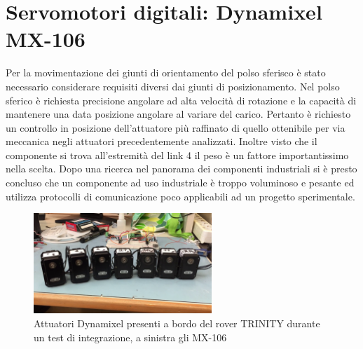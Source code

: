 \documentclass[%
corpo=11pt,
twoside,
 stile=classica,
oldstyle,
greek,%
]{toptesi}
\begin{document}
	\section{Servomotori digitali: Dynamixel MX-106}
	Per la movimentazione dei giunti di orientamento del polso sferisco è stato necessario considerare requisiti diversi dai giunti di posizionamento.
	 Nel polso sferico è richiesta precisione angolare ad alta velocità di rotazione e la capacità di mantenere una data posizione angolare al variare del carico. Pertanto è richiesto un controllo in posizione dell'attuatore più raffinato di quello ottenibile per via meccanica negli attuatori precedentemente analizzati. Inoltre visto che il componente si trova all'estremità del link 4 il peso è un fattore importantissimo nella scelta. 
	Dopo una ricerca nel panorama dei componenti industriali si è presto concluso che un componente ad uso industriale è troppo voluminoso e pesante ed utilizza protocolli di comunicazione poco applicabili ad un progetto sperimentale. 
	
	\begin{figure}
		\centering
		\includegraphics[width=0.6\textwidth]{image/dynamixel.png}
		\caption{Attuatori Dynamixel presenti a bordo del rover TRINITY durante un test di integrazione, a sinistra gli MX-106}
		\label{fig:MX160}
	\end{figure}
\end{document}

